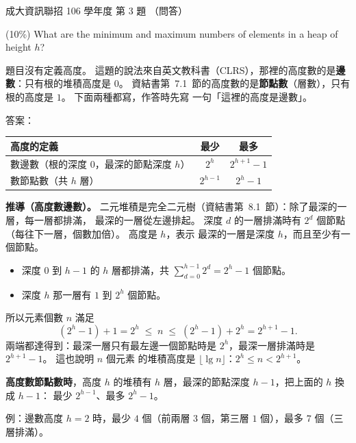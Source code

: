 \begin{pastexam}[label={px:ncku-106-prog-03}]{成大資訊聯招 106 學年度 第 3 題}
（問答）

(10\%) What are the minimum and maximum numbers of elements in a heap of height $h$?
\end{pastexam}

\begin{pastsoln}
題目沒有定義高度。 這題的說法來自英文教科書（CLRS），那裡的高度數的是\textbf{邊數}：只有根的堆積高度是
$0$。 資結書第~7.1~節的高度數的是\textbf{節點數}（層數），只有根的高度是 $1$。 下面兩種都寫，作答時先寫
一句「這裡的高度是邊數」。

答案：
\begin{center}
\begin{tabular}{lcc}
\toprule
高度的定義 & 最少 & 最多 \\
\midrule
數邊數（根的深度 $0$，最深的節點深度 $h$） & $2^h$ & $2^{h+1} - 1$ \\
數節點數（共 $h$ 層） & $2^{h-1}$ & $2^h - 1$ \\
\bottomrule
\end{tabular}
\end{center}

\textbf{推導（高度數邊數）。} 二元堆積是完全二元樹（資結書第~8.1~節）：除了最深的一層，每一層都排滿，
最深的一層從左邊排起。 深度 $d$ 的一層排滿時有 $2^d$ 個節點（每往下一層，個數加倍）。 高度是 $h$，表示
最深的一層是深度 $h$，而且至少有一個節點。
\begin{itemize}
\item 深度 $0$ 到 $h - 1$ 的 $h$ 層都排滿，共 $\sum_{d=0}^{h-1} 2^d = 2^h - 1$ 個節點。
\item 深度 $h$ 那一層有 $1$ 到 $2^h$ 個節點。
\end{itemize}
所以元素個數 $n$ 滿足
\[
(2^h - 1) + 1 = 2^h \;\le\; n \;\le\; (2^h - 1) + 2^h = 2^{h+1} - 1 .
\]
兩端都達得到：最深一層只有最左邊一個節點時是 $2^h$，最深一層排滿時是 $2^{h+1} - 1$。 這也說明 $n$ 個元素
的堆積高度是 $\lfloor \lg n \rfloor$：$2^h \le n < 2^{h+1}$。

\textbf{高度數節點數時}，高度 $h$ 的堆積有 $h$ 層，最深的節點深度 $h - 1$，把上面的 $h$ 換成 $h - 1$：
最少 $2^{h-1}$、最多 $2^h - 1$。

例：邊數高度 $h = 2$ 時，最少 $4$ 個（前兩層 $3$ 個，第三層 $1$ 個），最多 $7$ 個（三層排滿）。
\end{pastsoln}
